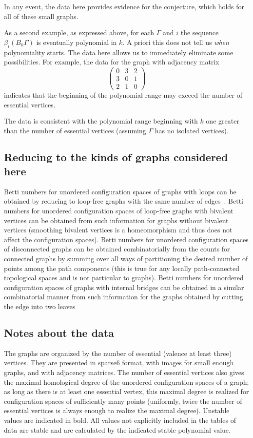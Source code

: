 \documentclass{amsart}
\theoremstyle{definition}
\begin{document}
In any event, the data here provides evidence for the conjecture, which holds for all of these small graphs.

As a second example, as expressed above, for each $\Gamma$ and $i$ the sequence $\beta_i(B_k\Gamma)$ is eventually polynomial in $k$. 
A priori this does not tell us \emph{when} polynomiality starts. 
The data here allows us to immediately eliminate some possibilities. 
For example, the data for the graph with adjacency matrix 
\[\left(\begin{array}{ccc}0&3&2\\3&0&1 \\ 2&1 & 0\end{array}\right)\]
indicates that the beginning of the polynomial range may exceed the number of essential vertices.

The data is consistent with the polynomial range beginning with $k$ one greater than the number of essential vertices (assuming $\Gamma$ has no isolated vertices).


\subsection*{Reducing to the kinds of graphs considered here}
Betti numbers for unordered configuration spaces of graphs with loops can be obtained by reducing to loop-free graphs with the same number of edges~\cite[Lemma 4.6]{AnDrummondColeKnudsen:ESHGBG}. 
Betti numbers for unordered configuration spaces of loop-free graphs with bivalent vertices can be obtained from such information for graphs without bivalent vertices (smoothing bivalent vertices is a homeomorphism and thus does not affect the configuration spaces). 
Betti numbers for unordered configuration spaces of disconnected graphs can be obtained combinatorially from the counts for connected graphs by summing over all ways of partitioning the desired number of points among the path components (this is true for any locally path-connected topological spaces and is not particular to graphs). 
Betti numbers for unordered configuration spaces of graphs with internal bridges can be obtained in a similar combinatorial manner from such information for the graphs obtained by cutting the edge into two leaves~\cite[Proposition 5.22]{AnDrummond-ColeKnudsen:SSGBG}

\subsection*{Notes about the data}
The graphs are organized by the number of essential (valence at least three) vertices. 
They are presented in sparse6 format, with images for small enough graphs, and with adjacency matrices.
The number of essential vertices also gives the maximal homological degree of the unordered configuration spaces of a graph; as long as there is at least one essential vertex, this maximal degree is realized for configuration spaces of sufficiently many points (uniformly, twice the number of essential vertices is always enough to realize the maximal degree).
Unstable values are indicated in bold.
All values not explicitly included in the tables of data are stable and are calculated by the indicated stable polynomial value.
\end{document}
